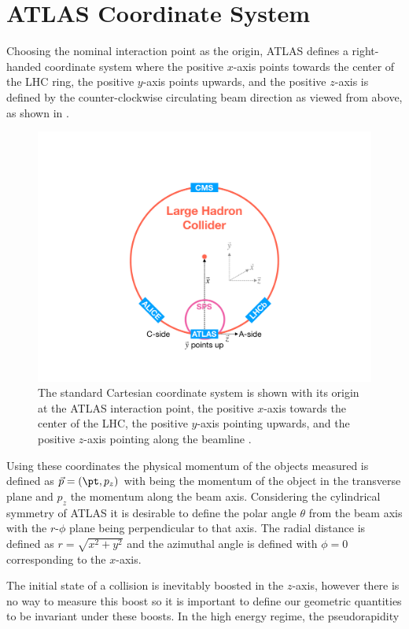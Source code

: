 \section{ATLAS Coordinate System} \label{sec:atlas:coordinates}

Choosing the nominal interaction point as the origin, ATLAS defines a right-handed
coordinate system where the positive $x$-axis points towards the center of the
LHC ring, the positive $y$-axis points upwards, and the positive $z$-axis is
defined by the counter-clockwise circulating beam direction as viewed from
above, as shown in  \cite{PERF-2007-01}.  
 
\begin{figure}[!htbp]
  \begin{center}
    \includegraphics[width=0.7\linewidth]{figures/atlas/atlas_geometry}
    \caption{ The standard Cartesian coordinate system is shown with its origin at
the ATLAS interaction point, the positive $x$-axis towards the center of the
LHC, the positive $y$-axis pointing upwards, and the positive $z$-axis pointing
along the beamline \cite{Feickert:2690521}.}
    \label{fig:atlas_geometry}
  \end{center}
\end{figure}

Using these coordinates the physical momentum of the objects measured is
defined as $\vec{p} = (\pt,p_z)$ with \pt being the momentum of the object in
the transverse plane and $p_z$ the momentum along the beam axis. Considering
the cylindrical symmetry of ATLAS it is desirable to define the polar angle
$\theta$ from the beam axis with the $r$-$\phi$ plane being perpendicular to
that axis.  The radial distance is defined as $r = \sqrt{x^2+y^2}$ and the
azimuthal angle is defined with $\phi = 0$ corresponding to the $x$-axis.

The initial state of a collision is inevitably boosted in the $z$-axis, however
there is no way to measure this boost so it is important to define our
geometric quantities to be invariant under these boosts. In the high energy
regime, the pseudorapidity 


